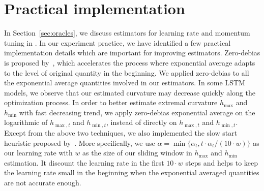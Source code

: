 \section{Practical implementation}
\label{sec:practical_impl}
In Section~\ref{sec:oracles}, we discuss estimators for learning rate and momentum tuning in \tuner. In our experiment practice, we have identified a few practical implementation details which are important for improving estimators. Zero-debias is proposed by~\citet{kingma2014adam}, which accelerates the process where exponential average adapts to the level of original quantity in the beginning. We applied zero-debias to all the exponential average quantities involved in our estimators. In some LSTM models, we observe that our estimated curvature may decrease quickly along the optimization process. In order to better estimate extremal curvature $h_{\max}$ and $h_{\min}$ with fast decreasing trend, we apply zero-debias exponential average on the logarithmic of $h_{\max, t}$ and $h_{\min, t}$, instead of directly on $h_{\max, t}$ and $h_{\min, t}$. Except from the above two techniques, we also implemented the slow start heuristic proposed by~\citep{schaul2013no}. More specifically, we use $\alpha = \min\{\alpha_t, t \cdot \alpha_t / (10 \cdot w) \}$ as our learning rate with $w$ as the size of our sliding window in $h_{\max}$ and $h_{\min}$ estimation. It discount the learning rate in the first $10 \cdot w$ steps and helps to keep the learning rate small in the beginning when the exponential averaged quantities are not accurate enough.